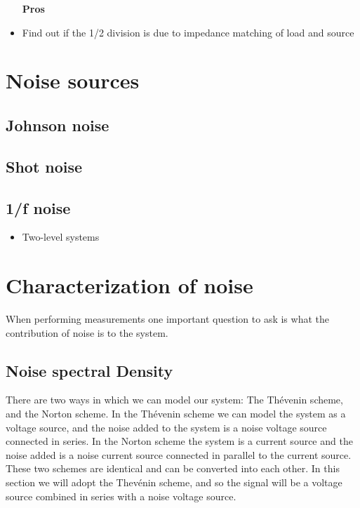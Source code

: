 \documentclass[12pt]{report}
\begin{document}
\begin{itemize}
    \item [\textbf{Pros}]
    \item Find out if the 1/2 division is due to impedance matching of load and source
\end{itemize}





\section{Noise sources}

\subsection{Johnson noise}

\subsection{Shot noise}

\subsection{1/f noise}
\begin{itemize}
    \item Two-level systems
\end{itemize}


\section{Characterization of noise}

When performing measurements one important question to ask is what the contribution of noise is to the system.


\subsection{Noise spectral Density}

There are two ways in which we can model our system: The Th\'evenin scheme, and the Norton scheme. In the Th\'evenin scheme we can model the system as a voltage source, and the noise added to the system is a noise voltage source connected in series. In the Norton scheme the system is a current source and the noise added is a noise current source connected in parallel to the current source. These two schemes are identical and can be converted into each other. In this section we will adopt the Thev\'enin scheme, and so the signal will be a voltage source combined in series with a noise voltage source.
\end{document}

